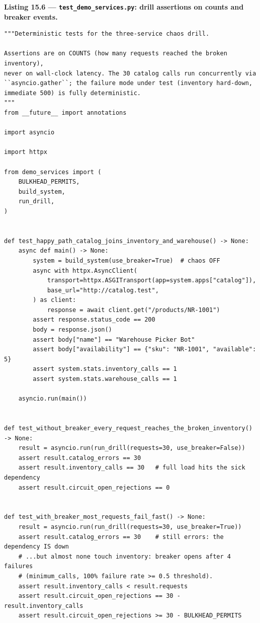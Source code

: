 \noindent\textbf{Listing 15.6 --- \texttt{test\_demo\_services.py}:
drill assertions on counts and breaker events.}
\label{lst:ch15-demo-tests}
\begin{verbatim}
"""Deterministic tests for the three-service chaos drill.

Assertions are on COUNTS (how many requests reached the broken inventory),
never on wall-clock latency. The 30 catalog calls run concurrently via
``asyncio.gather``; the failure mode under test (inventory hard-down,
immediate 500) is fully deterministic.
"""
from __future__ import annotations

import asyncio

import httpx

from demo_services import (
    BULKHEAD_PERMITS,
    build_system,
    run_drill,
)


def test_happy_path_catalog_joins_inventory_and_warehouse() -> None:
    async def main() -> None:
        system = build_system(use_breaker=True)  # chaos OFF
        async with httpx.AsyncClient(
            transport=httpx.ASGITransport(app=system.apps["catalog"]),
            base_url="http://catalog.test",
        ) as client:
            response = await client.get("/products/NR-1001")
        assert response.status_code == 200
        body = response.json()
        assert body["name"] == "Warehouse Picker Bot"
        assert body["availability"] == {"sku": "NR-1001", "available": 5}
        assert system.stats.inventory_calls == 1
        assert system.stats.warehouse_calls == 1

    asyncio.run(main())


def test_without_breaker_every_request_reaches_the_broken_inventory() -> None:
    result = asyncio.run(run_drill(requests=30, use_breaker=False))
    assert result.catalog_errors == 30
    assert result.inventory_calls == 30   # full load hits the sick dependency
    assert result.circuit_open_rejections == 0


def test_with_breaker_most_requests_fail_fast() -> None:
    result = asyncio.run(run_drill(requests=30, use_breaker=True))
    assert result.catalog_errors == 30    # still errors: the dependency IS down
    # ...but almost none touch inventory: breaker opens after 4 failures
    # (minimum_calls, 100% failure rate >= 0.5 threshold).
    assert result.inventory_calls < result.requests
    assert result.circuit_open_rejections == 30 - result.inventory_calls
    assert result.circuit_open_rejections >= 30 - BULKHEAD_PERMITS



\end{verbatim}
